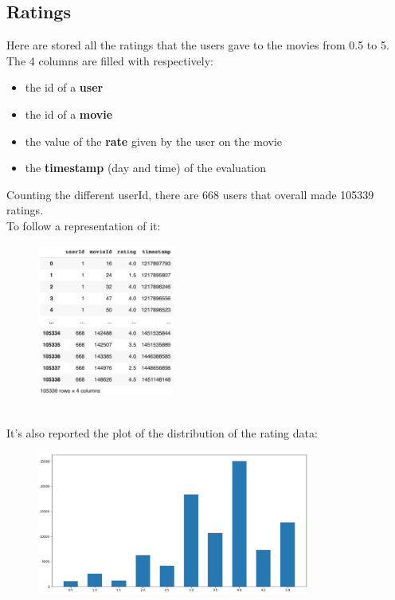 \documentclass{article}
\begin{document}
\subsection{Ratings}
Here are stored all the ratings that the users gave to the movies from 0.5 to 5. The 4 columns are filled with respectively: 
\begin{itemize}
      \item the id of a \textbf{user}
      \item the id of a \textbf{movie}
      \item the value of the \textbf{rate} given by the user on the movie
      \item the \textbf{timestamp} (day and time) of the evaluation
\end{itemize}
Counting the different userId, there are 668 users that overall made 105339 ratings. \\
To follow a representation of it:
\begin{figure}[ht]
      \begin{center}
            \includegraphics[width=0.4\textwidth]{images/ratings data.png}
      \end{center}
\end{figure}\\
It's also reported the plot of the distribution of the rating data:
\begin{figure}[ht]
      \begin{center}
            \includegraphics[width=0.8\textwidth]{images/rating distributions.png}
      \end{center}
\end{figure}
\end{document}
